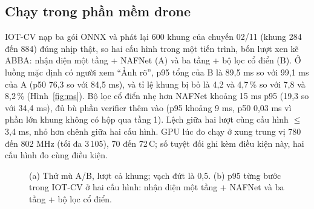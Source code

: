 \subsection{Chạy trong phần mềm drone}

IOT-CV nạp ba gói ONNX và phát lại 600 khung của chuyến 02/11 (khung 284 đến 884) đúng nhịp thật, so hai cấu hình trong một tiến trình, bốn lượt xen kẽ ABBA: nhận diện một tầng + NAFNet (A) và ba tầng + bộ lọc cổ điển (B). Ở luồng mặc định có người xem ``Ảnh rõ'', p95 tổng của B là 89,5 ms so với 99,1 ms của A (p50 76,3 so với 84,5 ms), và tỉ lệ khung bị bỏ là 4,2 và 4,7\,\% so với 7,8 và 8,2\,\% (Hình~\ref{fig:ms}). Bộ lọc cổ điển nhẹ hơn NAFNet khoảng 15 ms p95 (19,3 so với 34,4 ms), đủ bù phần verifier thêm vào (p95 khoảng 9 ms, p50 0,03 ms vì phần lớn khung không có hộp qua tầng 1). Lệch giữa hai lượt cùng cấu hình $\leq$ 3,4 ms, nhỏ hơn chênh giữa hai cấu hình. GPU lúc đo chạy ở xung trung vị 780 đến 802 MHz (tối đa 3\,105), 70 đến 72\,\textdegree C; số tuyệt đối ghi kèm điều kiện này, hai cấu hình đo cùng điều kiện.

\begin{figure}[!htbp]
\centering

\caption[Thử mù A/B và thời gian xử lý trong IOT-CV]{(a) Thử mù A/B, lượt cả khung; vạch đứt là 0,5. (b) p95 từng bước trong IOT-CV ở hai cấu hình: nhận diện một tầng + NAFNet và ba tầng + bộ lọc cổ điển.}
\label{fig:ab-ms}
\end{figure}
